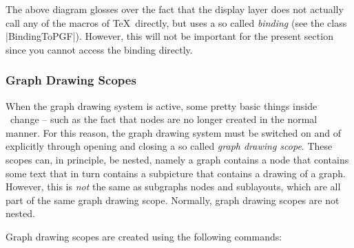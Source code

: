 \medskip

The above diagram glosses over the fact that the display layer does not
actually call any of the macros of \TeX\ directly, but uses a so called
\emph{binding} (see the class |BindingToPGF|). However, this will not be
important for the present section since you cannot access the binding directly.


\subsubsection{Graph Drawing Scopes}
\label{section-gd-scopes}

When the graph drawing system is active, some pretty basic things inside
\pgfname\ change -- such as the fact that nodes are no longer created in the
normal manner. For this reason, the graph drawing system must be switched on
and of explicitly through opening and closing a so called \emph{graph drawing
scope}. These scopes can, in principle, be nested, namely a graph contains a
node that contains some text that in turn contains a subpicture that contains a
drawing of a graph. However, this is \emph{not} the same as subgraphs nodes and
sublayouts, which are all part of the same graph drawing scope. Normally, graph
drawing scopes are not nested.

Graph drawing scopes are created using the following commands:

